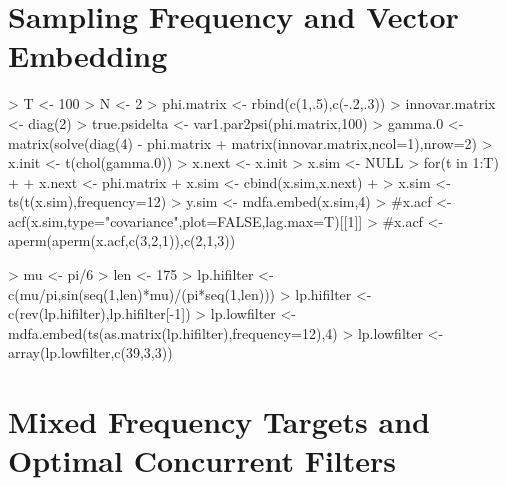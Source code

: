 \documentclass[a4paper]{book}
\begin{document}
\section{Sampling Frequency and Vector Embedding}
\label{sec:mix-svf}

\begin{Schunk}
\begin{Sinput}
> T <- 100
> N <- 2
> phi.matrix <- rbind(c(1,.5),c(-.2,.3))
> innovar.matrix <- diag(2)
> true.psidelta <- var1.par2psi(phi.matrix,100)
> gamma.0 <- matrix(solve(diag(4) - phi.matrix %x% phi.matrix) %*% 
+ 	matrix(innovar.matrix,ncol=1),nrow=2)
> x.init <- t(chol(gamma.0)) %*% rnorm(2)
> x.next <- x.init
> x.sim <- NULL
> for(t in 1:T)
+ {
+ 	x.next <- phi.matrix %*% x.next + rnorm(2)
+ 	x.sim <- cbind(x.sim,x.next)
+ }
> x.sim <- ts(t(x.sim),frequency=12)
> y.sim <- mdfa.embed(x.sim,4)
> #x.acf <- acf(x.sim,type="covariance",plot=FALSE,lag.max=T)[[1]]
> #x.acf <- aperm(aperm(x.acf,c(3,2,1)),c(2,1,3))
\end{Sinput}
\end{Schunk}



\begin{Schunk}
\begin{Sinput}
>  mu <- pi/6
>  len <- 175
>  lp.hifilter <- c(mu/pi,sin(seq(1,len)*mu)/(pi*seq(1,len)))
>  lp.hifilter <- c(rev(lp.hifilter),lp.hifilter[-1])
>  lp.lowfilter <- mdfa.embed(ts(as.matrix(lp.hifilter),frequency=12),4)
>  lp.lowfilter <- array(lp.lowfilter,c(39,3,3))
\end{Sinput}
\end{Schunk}

\section{Mixed Frequency Targets and Optimal Concurrent Filters}
\label{sec:mix-mdfa}
\end{document}
